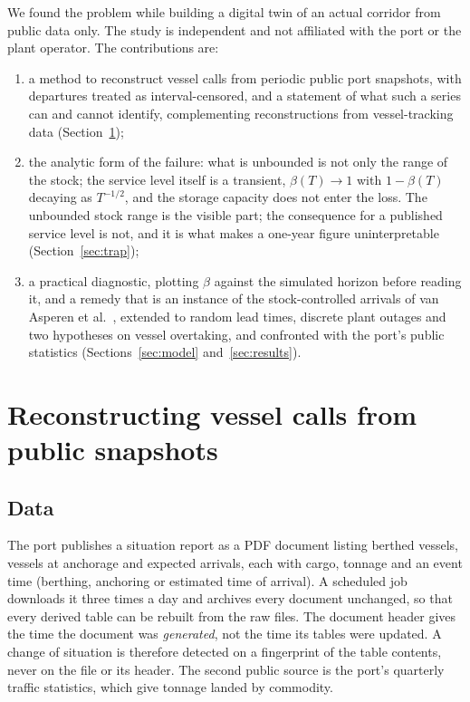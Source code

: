 \documentclass[conference]{IEEEtran}   %
\begin{document}
We found the problem while building a digital twin of an actual corridor from public data
only. The study is independent and not affiliated with the port or the plant operator. The
contributions are:
\begin{enumerate}
\item a method to reconstruct vessel calls from periodic public port snapshots, with
departures treated as interval-censored, and a statement of what such a series can and
cannot identify, complementing reconstructions from vessel-tracking data
\cite{wu2020} (Section~\ref{sec:reconstruction});
\item the analytic form of the failure: what is unbounded is not only the range of the
stock; the service level itself is a transient, $\beta(T)\to 1$ with $1-\beta(T)$ decaying as
$T^{-1/2}$, and the storage capacity does not enter the loss. The unbounded stock range is the
visible part; the consequence for a published service level is not, and it is what makes a
one-year figure uninterpretable (Section~\ref{sec:trap});
\item a practical diagnostic, plotting $\beta$ against the simulated horizon before reading
it, and a remedy that is an instance of the stock-controlled arrivals of van Asperen et
al.~\cite{vanasperen2003}, extended to random lead times, discrete plant outages and two
hypotheses on vessel overtaking, and confronted with the port's public statistics
(Sections~\ref{sec:model} and~\ref{sec:results}).
\end{enumerate}

\section{Reconstructing vessel calls from public snapshots}
\label{sec:reconstruction}

\subsection{Data}
The port publishes a situation report as a PDF document listing berthed vessels, vessels
at anchorage and expected arrivals, each with cargo, tonnage and an event time (berthing,
anchoring or estimated time of arrival). A scheduled job downloads it three times a day and
archives every document unchanged, so that every derived table can be rebuilt from the raw
files. The document header gives the time the document was \emph{generated}, not the time
its tables were updated. A change of situation is therefore detected on a fingerprint of
the table contents, never on the file or its header. The second public source is the port's
quarterly traffic statistics, which give tonnage landed by commodity.
\end{document}

